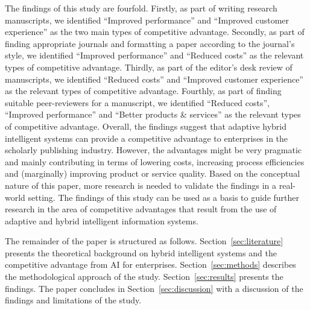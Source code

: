 The findings of this study are fourfold. Firstly, as part of writing research manuscripts, we identified
``Improved performance'' and ``Improved customer experience'' as the two main types of competitive advantage.
Secondly, as part of finding appropriate journals and formatting a paper according to the journal's style, 
we identified ``Improved performance'' and ``Reduced costs'' as the relevant types of competitive advantage.
Thirdly, as part of the editor's desk review of manuscripts, we identified ``Reduced costs'' and ``Improved
customer experience'' as the relevant types of competitive advantage. Fourthly, as part of finding suitable 
peer-reviewers for a manuscript, we identified ``Reduced costs'', ``Improved performance'' and ``Better 
products \& services'' as the relevant types of competitive advantage. Overall, the findings suggest that
adaptive hybrid intelligent systems can provide a competitive advantage to enterprises in the scholarly
publishing industry. However, the advantages might be very pragmatic and mainly contributing in terms of
lowering costs, increasing process efficiencies and (marginally) improving product or service quality. Based
on the conceptual nature of this paper, more research is needed to validate the findings in a real-world
setting. The findings of this study can be used as a basis to guide further research in the area of
competitive advantages that result from the use of adaptive and hybrid intelligent information systems.

The remainder of the paper is structured as follows. Section~\ref{sec:literature} presents the theoretical
background on hybrid intelligent systems and the competitive advantage from AI for enterprises. Section~\ref{sec:methods}
describes the methodological approach of the study. Section~\ref{sec:results} presents the findings. The paper
concludes in Section~\ref{sec:discussion} with a discussion of the findings and limitations of the study.